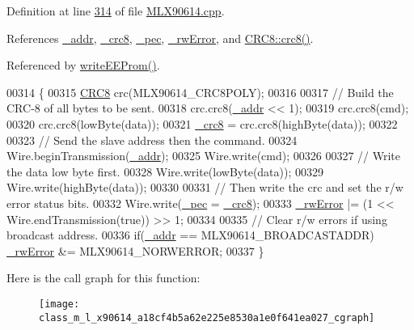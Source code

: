 Definition at line \mbox{\hyperlink{_m_l_x90614_8cpp_source_l00314}{314}} of file \mbox{\hyperlink{_m_l_x90614_8cpp_source}{M\+L\+X90614.\+cpp}}.



References \mbox{\hyperlink{_m_l_x90614_8h_source_l00145}{\+\_\+addr}}, \mbox{\hyperlink{_m_l_x90614_8h_source_l00147}{\+\_\+crc8}}, \mbox{\hyperlink{_m_l_x90614_8h_source_l00148}{\+\_\+pec}}, \mbox{\hyperlink{_m_l_x90614_8h_source_l00146}{\+\_\+rw\+Error}}, and \mbox{\hyperlink{_crc8_8cpp_source_l00042}{C\+R\+C8\+::crc8()}}.



Referenced by \mbox{\hyperlink{_m_l_x90614_8cpp_source_l00354}{write\+E\+E\+Prom()}}.


\begin{DoxyCode}
00314                                                  \{
00315     \mbox{\hyperlink{class_c_r_c8}{CRC8}} crc(MLX90614\_CRC8POLY);
00316 
00317     \textcolor{comment}{// Build the CRC-8 of all bytes to be sent.}
00318     crc.crc8(\mbox{\hyperlink{class_m_l_x90614_a768925264f76f33f9bf98aec1cbec6a9}{\_addr}} << 1);
00319     crc.crc8(cmd);
00320     crc.crc8(lowByte(data));
00321     \mbox{\hyperlink{class_m_l_x90614_add210d34992507e8ccb753a040b14395}{\_crc8}} = crc.crc8(highByte(data));
00322 
00323     \textcolor{comment}{// Send the slave address then the command.}
00324     Wire.beginTransmission(\mbox{\hyperlink{class_m_l_x90614_a768925264f76f33f9bf98aec1cbec6a9}{\_addr}});
00325     Wire.write(cmd);
00326 
00327     \textcolor{comment}{// Write the data low byte first.}
00328     Wire.write(lowByte(data));
00329     Wire.write(highByte(data));
00330 
00331     \textcolor{comment}{// Then write the crc and set the r/w error status bits.}
00332     Wire.write(\mbox{\hyperlink{class_m_l_x90614_a2526978eb988a8712baee6dca596be15}{\_pec}} = \mbox{\hyperlink{class_m_l_x90614_add210d34992507e8ccb753a040b14395}{\_crc8}});
00333     \mbox{\hyperlink{class_m_l_x90614_a8c203cc9359c283d07682ba7dbcc5de3}{\_rwError}} |= (1 << Wire.endTransmission(\textcolor{keyword}{true})) >> 1;
00334 
00335     \textcolor{comment}{// Clear r/w errors if using broadcast address.}
00336     \textcolor{keywordflow}{if}(\mbox{\hyperlink{class_m_l_x90614_a768925264f76f33f9bf98aec1cbec6a9}{\_addr}} == MLX90614\_BROADCASTADDR) \mbox{\hyperlink{class_m_l_x90614_a8c203cc9359c283d07682ba7dbcc5de3}{\_rwError}} &= MLX90614\_NORWERROR;
00337 \}
\end{DoxyCode}
Here is the call graph for this function\+:\nopagebreak
\begin{figure}[H]
\begin{center}
\leavevmode
\texttt{[image: class\_m\_l\_x90614\_a18cf4b5a62e225e8530a1e0f641ea027\_cgraph]}
\end{center}
\end{figure}
